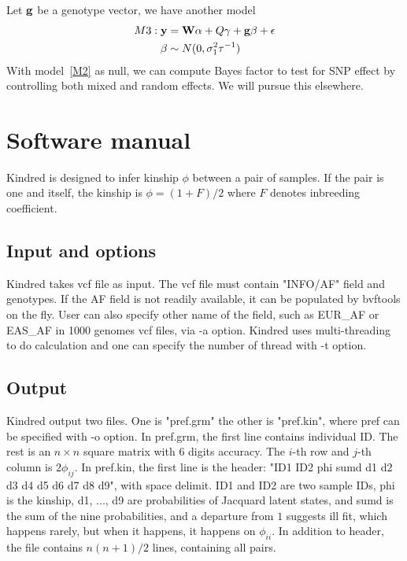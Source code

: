 \documentclass[11pt,Times]{article}
\begin{document}
Let ${\mathbf{g}}$ be a genotype vector, we have another model 
\begin{equation}\label{H1}
\begin{aligned}
M3: {\mathbf{y}} &= {\mathbf{W}} \alpha  + Q {\mathbf{\gamma}} + {\mathbf{g}} \beta + {\mathbf{\epsilon}} \\
\beta & \sim N(0, \sigma_1^2 \tau^{-1}) \\
\end{aligned}
\end{equation}
With model~\ref{M2} as null, we can compute Bayes factor to test for SNP effect by controlling both mixed and random effects. We will pursue this elsewhere. 

\newpage



\newpage 
\section{Software manual}

Kindred is designed to infer kinship $\phi$ between a pair of samples. If the pair is one and itself, the kinship is $\phi = (1+F)/2$ where $F$ denotes inbreeding coefficient. 

\subsection{Input and options}
Kindred takes vcf file as input. The vcf file must contain "INFO/AF" field and genotypes. If the AF field is not readily available, it can be populated by bvftools  on the fly. 
User can also specify other name of the field, such as EUR\_AF or EAS\_AF in 1000 genomes vcf files, via -a option. 
Kindred uses multi-threading to do calculation and one can specify the number of thread with -t option. 

\subsection{Output}
Kindred output two files. One is "pref.grm" the other is "pref.kin", where pref can be specified with -o option. 
In pref.grm, the first line contains individual ID. 
The rest is an $n\times n$ square matrix with 6 digits accuracy. The $i$-th row and $j$-th column is $2\phi_{ij}$. 
In pref.kin, the first line is the header: "ID1 ID2 phi sumd d1 d2 d3 d4 d5 d6 d7 d8 d9", with space delimit. 
ID1 and ID2 are two sample IDs, phi is the kinship, d1, ..., d9 are probabilities of Jacquard latent states, and sumd is the sum of the nine probabilities, and a departure from $1$ suggests ill fit, which happens rarely, but when it happens, it happens on $\phi_{ii}$.   
In addition to header, the file contains $n(n+1)/2$ lines, containing all pairs.   
\end{document}
